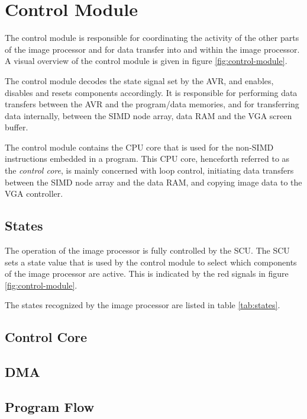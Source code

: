 \section{Control Module}

The control module is responsible for coordinating the activity of the
other parts of the image processor and for data transfer into and within
the image processor. A visual overview of the control module is given in
figure \ref{fig:control-module}.



The control module decodes the state signal set by the AVR, and enables,
disables and resets components accordingly. It is responsible for
performing data transfers between the AVR and the program/data memories,
and for transferring data internally, between the SIMD node array, data
RAM and the VGA screen buffer.

The control module contains the CPU core that is used for the non-SIMD
instructions embedded in a program. This CPU core, henceforth referred
to as the \emph{control core}, is mainly concerned with loop control,
initiating data transfers between the SIMD node array and the data RAM,
and copying image data to the VGA controller.

\subsection{States}

The operation of the image processor is fully controlled by the SCU. The
SCU sets a state value that is used by the control module to select
which components of the image processor are active. This is indicated by
the red signals in figure \ref{fig:control-module}.

The states recognized by the image processor are listed in table
\ref{tab:states}.



\subsection{Control Core}
\subsection{DMA}
\subsection{Program Flow}
